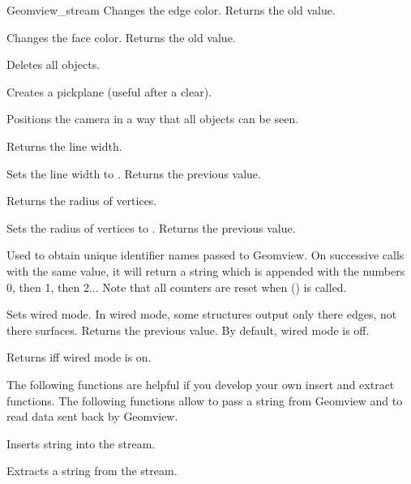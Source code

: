 \begin{ccRefClass}{Geomview_stream}
{Changes the edge color. Returns the old value.}


{Changes the face color. Returns the old value.}



{Deletes all objects.}

{Creates a pickplane (useful after a clear).}

{Positions the camera in a way that all objects can be seen.}

{Returns the line width.}

{Sets the line width to . Returns the previous value.}

{Returns the radius of vertices.}

{Sets the radius of vertices to . Returns the previous value.}

{Used to obtain unique identifier names passed to Geomview.  On successive
calls with the same  value, it will return a string which is 
appended with the numbers 0, then 1, then 2...  Note that all counters are
reset when () is called.}

{Sets wired mode.  In wired mode, some structures output only there edges,
 not there surfaces.
 Returns the previous value. By default, wired mode is off.}

{Returns  iff wired mode is on.}


\begin{ccAdvanced}


The following functions are helpful if you develop your own insert
and extract functions. The following functions allow to pass a string
from Geomview and to read data sent back by Geomview.

{Inserts string  into the stream.}


{Extracts a string  from the stream.
}


\end{ccAdvanced}
\end{ccRefClass}

